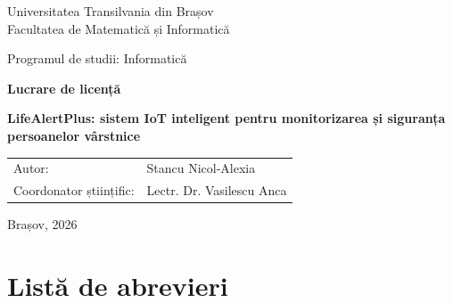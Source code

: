 \documentclass[12pt,a4paper]{article}
\begin{document}
\begin{titlepage}
\thispagestyle{empty}
\begin{center}

{\large Universitatea Transilvania din Brașov\\[0.3em]
Facultatea de Matematică și Informatică}

\vspace{0.6em}
{\small Programul de studii: Informatică}

\vfill

{\Huge\bfseries Lucrare de licență\par}

\vspace{1.2em}

{\LARGE\bfseries LifeAlertPlus: sistem IoT inteligent pentru monitorizarea și siguranța persoanelor vârstnice\par}

\vfill

\begin{flushleft}
\large
\begin{tabular}{@{}ll@{}}
Autor: & Stancu Nicol-Alexia\\[0.5em]
Coordonator științific: & Lectr. Dr. Vasilescu Anca\\
\end{tabular}
\end{flushleft}

\vfill

{\large Brașov, 2026}

\end{center}
\end{titlepage}

\newpage
\tableofcontents
\newpage

{}
\listoffigures
\newpage

{}
\listoftables
\newpage

{}
\section*{Listă de abrevieri}
\end{document}
